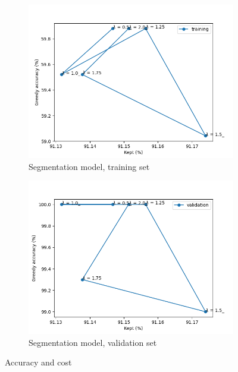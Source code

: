 \begin{figure}
    \begin{subfigure}[b]{0.47\textwidth}
        \centering
        \includegraphics[width=1.1\textwidth]{figs/structured_acc_cost_train.png}
        \caption{Segmentation model, training set}
        \label{fig:str_train}
    \end{subfigure}
    \hfill
    \begin{subfigure}[b]{0.47\textwidth}
        \centering
        \includegraphics[width=1.1\textwidth]{figs/structured_acc_cost_val.png}
        \caption{Segmentation model, validation set}
        \label{fig:str_val}
    \end{subfigure}
    \caption{Accuracy and cost}
    \label{fig:acc_cost}
\end{figure}

